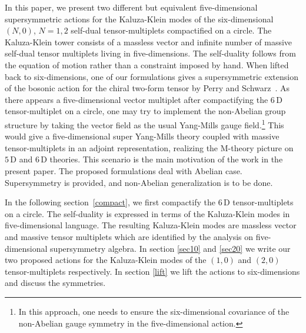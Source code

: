 \documentclass[a4paper,12pt]{article}
\begin{document}
\indent In this paper, we present two different but equivalent  five-dimensional supersymmetric actions for the Kaluza-Klein modes of  the six-dimensional $(N,0)$, $N=1,2$ self-dual tensor-multiplets compactified on a circle.  The Kaluza-Klein tower consists of a massless vector and infinite number of massive self-dual tensor multiplets living in five-dimensions. The self-duality follows from the equation of motion rather than a constraint imposed by hand.  When lifted back to six-dimensions, one of our formulations   gives  a  supersymmetric extension of the bosonic action for the chiral two-form tensor by Perry and Schwarz~\cite{9611065}.  As there appears a five-dimensional vector multiplet after  compactifying  the $6$\,D  tensor-multiplet on a circle, one may try to implement the non-Abelian group structure by taking the vector field as the usual Yang-Mills gauge field.\footnote{In this approach, one needs to ensure the six-dimensional covariance of the non-Abelian gauge symmetry in the five-dimensional action.}  This would give a five-dimensional super Yang-Mills theory coupled with massive tensor-multiplets in an adjoint representation, realizing the M-theory picture on $5\,$D and $6\,$D theories.  This scenario is the main motivation of the work in the present paper. The proposed formulations deal with Abelian case. Supersymmetry is provided, and non-Abelian generalization is to be done. \newline


  

\indent In the following  section~\ref{compact}, we first compactify the $6$\,D  tensor-multiplets  on a circle. The self-duality is expressed in terms of the Kaluza-Klein modes  in five-dimensional language. The  resulting Kaluza-Klein modes are massless vector and massive tensor multiplets which are identified by the analysis on five-dimensional supersymmetry algebra.  In section \ref{sec10} and \ref{sec20} we write our two proposed actions for the Kaluza-Klein modes of the $(1,0)$ and $(2,0)$ tensor-multiplets  respectively.  In section \ref{lift} we lift the actions to six-dimensions and discuss the symmetries. 
       

   

 
\end{document}
